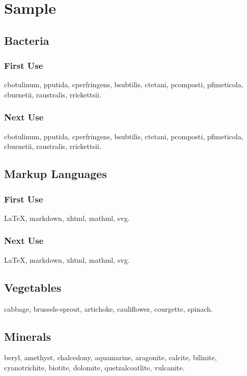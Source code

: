 \documentclass{scrreprt}
\begin{document}
\chapter{Sample}
\section{Bacteria}
\subsection{First Use}
\gls{cbotulinum}, \gls{pputida}, \gls{cperfringens},
\gls{bsubtilis}, \gls{ctetani}, \gls{pcomposti},
\gls{pfimeticola}, \gls{cburnetii}, \gls{raustralis},
\gls{rrickettsii}.

\subsection{Next Use}
\gls{cbotulinum}, \gls{pputida}, \gls{cperfringens},
\gls{bsubtilis}, \gls{ctetani}, \gls{pcomposti},
\gls{pfimeticola}, \gls{cburnetii}, \gls{raustralis},
\gls{rrickettsii}.

\section{Markup Languages}
\subsection{First Use}
\gls{LaTeX}, \gls{markdown}, \gls{xhtml}, \gls{mathml}, \gls{svg}.

\subsection{Next Use}
\gls{LaTeX}, \gls{markdown}, \gls{xhtml}, \gls{mathml}, \gls{svg}.

\section{Vegetables}
\gls{cabbage}, \gls{brussels-sprout}, \gls{artichoke}, 
\gls{cauliflower}, \gls{courgette}, \gls{spinach}.

\section{Minerals}
\Gls{beryl}, \gls{amethyst}, \gls{chalcedony}, \gls{aquamarine},
\gls{aragonite}, \gls{calcite}, \gls{bilinite}, 
\gls{cyanotrichite}, \gls{biotite}, \gls{dolomite}, 
\gls{quetzalcoatlite}, \gls{vulcanite}.
\end{document}

